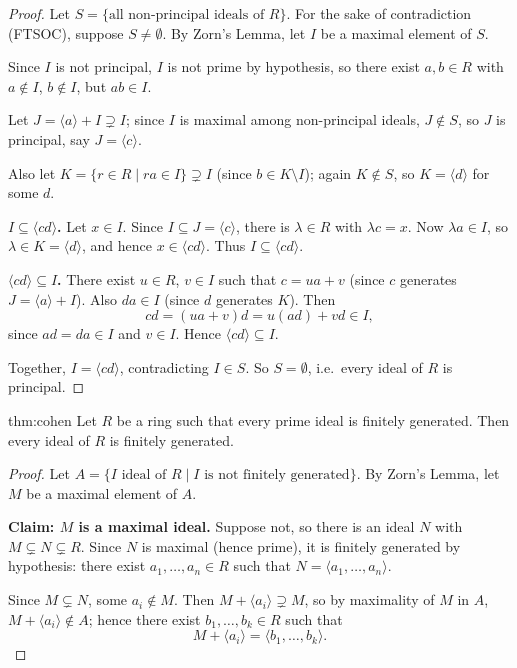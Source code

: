 \begin{proof}
Let $S = \{\text{all non-principal ideals of } R\}$. For the sake of contradiction (FTSOC), suppose $S \neq \emptyset$. By Zorn's Lemma, let $I$ be a maximal element of $S$.

Since $I$ is not principal, $I$ is not prime by hypothesis, so there exist $a, b \in R$ with $a \notin I$, $b \notin I$, but $ab \in I$.

Let $J = \langle a \rangle + I \supsetneq I$; since $I$ is maximal among non-principal ideals, $J \notin S$, so $J$ is principal, say $J = \langle c \rangle$.

Also let $K = \{ r \in R \mid ra \in I \} \supsetneq I$ (since $b \in K \setminus I$); again $K \notin S$, so $K = \langle d \rangle$ for some $d$.

\textbf{$I \subseteq \langle cd \rangle$.} Let $x \in I$. Since $I \subseteq J = \langle c \rangle$, there is $\lambda \in R$ with $\lambda c = x$. Now $\lambda a \in I$, so $\lambda \in K = \langle d \rangle$, and hence $x \in \langle cd \rangle$. Thus $I \subseteq \langle cd \rangle$.

\textbf{$\langle cd \rangle \subseteq I$.} There exist $u \in R$, $v \in I$ such that $c = ua + v$ (since $c$ generates $J = \langle a \rangle + I$). Also $da \in I$ (since $d$ generates $K$). Then
\[
cd = (ua+v)d = u(ad) + vd \in I,
\]
since $ad = da \in I$ and $v \in I$. Hence $\langle cd \rangle \subseteq I$.

Together, $I = \langle cd \rangle$, contradicting $I \in S$. So $S = \emptyset$, i.e.\ every ideal of $R$ is principal.
\end{proof}

\begin{theorem}{}{thm:cohen}
Let $R$ be a ring such that every prime ideal is finitely generated. Then every ideal of $R$ is finitely generated.
\end{theorem}

\begin{proof}
Let $A = \{ I \text{ ideal of } R \mid I \text{ is not finitely generated} \}$. By Zorn's Lemma, let $M$ be a maximal element of $A$.

\textbf{Claim: $M$ is a maximal ideal.} Suppose not, so there is an ideal $N$ with $M \subsetneq N \subsetneq R$. Since $N$ is maximal (hence prime), it is finitely generated by hypothesis: there exist $a_1, \ldots, a_n \in R$ such that $N = \langle a_1, \ldots, a_n \rangle$.

Since $M \subsetneq N$, some $a_i \notin M$. Then $M + \langle a_i \rangle \supsetneq M$, so by maximality of $M$ in $A$, $M + \langle a_i \rangle \notin A$; hence there exist $b_1, \ldots, b_k \in R$ such that
\[
M + \langle a_i \rangle = \langle b_1, \ldots, b_k \rangle.
\]
\end{proof}

